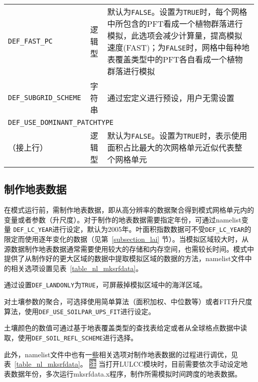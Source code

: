 \begin{table}[!htbp]
\begin{tabular}{lcp{}}
\texttt{DEF\_FAST\_PC} & 逻辑型 & 默认为\texttt{FALSE}。设置为\texttt{TRUE}时，每个网格中所包含的PFT看成一个植物群落进行模拟，此选项会减少计算量，提高模拟速度(FAST)；为\texttt{FALSE}时，网格中每种地表覆盖类型中的PFT各自看成一个植物群落进行模拟\\
\texttt{DEF\_SUBGRID\_SCHEME} & 字符串 & 通过宏定义进行预设，用户无需设置 \\
\multicolumn{3}{l}{\texttt{DEF\_USE\_DOMINANT\_PATCHTYPE}} \\
（接上行）& 逻辑型 & 默认为\texttt{FALSE}。设置为\texttt{TRUE}时，表示使用面积占比最大的次网格单元近似代表整个网格单元\\
\bottomrule
\end{tabular}
\end{table}

\subsection{制作地表数据}

在模式运行前，需制作地表数据，即从高分辨率的数据聚合得到模式网格单元内的变量或者参数（升尺度）。对于制作的地表数据需要指定年份，可通过namelist变量 \texttt{DEF\_LC\_YEAR}进行设定，默认为2005年。叶面积指数数据可不受\texttt{DEF\_LC\_YEAR}的限定而使用逐年变化的数据（见第~\ref{subsection_lai} 节）。当模拟区域较大时，从源数据制作地表数据通常需要使用较大的存储和内存空间，也需较长时间。模式中提供了从制作好的更大区域的数据中提取模拟区域的数据的方法，namelist文件中的相关选项设置见表~\ref{table_nl_mksrfdata}。

通过设置\texttt{DEF\_LANDONLY}为\texttt{TRUE}，可屏蔽掉模拟区域中的海洋区域。

对土壤参数的聚合，可选择使用简单算法（面积加权、中位数等）或者FIT升尺度算法，使用\texttt{DEF\_USE\_SOILPAR\_UPS\_FIT}进行设定。

土壤颜色的数值可通过基于地表覆盖类型的查找表给定或者从全球格点数据中读取，使用\texttt{DEF\_SOIL\_REFL\_SCHEME}进行选择。

此外，namelist文件中也有一些相关选项对制作地表数据的过程进行调优，见表~\ref{table_nl_mksrfdata}。
\newline
\newline
\noindent \colorbox{gray}{\textcolor{white}{\bf{注}}} 当打开LULCC模块时，目前需要依次手动设定地表数据年份，多次运行mksrfdata.x程序，制作所需模拟时间跨度的地表数据。

